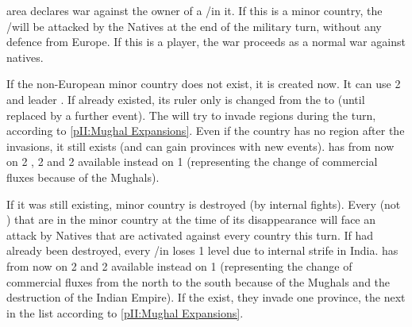 
\phevnt
\aparag \ROTW area \granderegionCeylan declares war against the owner of a
\TP/\COL in it.
\aparag If this is a minor country, the \TP/\COL will be attacked by the
Natives at the end of the military turn, without any defence from Europe.
\aparag If this is a player, the war proceeds as a normal war against natives.





\phevnt
\aparag If the non-European minor country \paysMogol does not exist, it is
created now.  It can use 2 \ARMY\faceplus and leader .
\aparag If \paysMogol already existed, its ruler only is changed from the
 to \leaderAkbar (until replaced by a further event).
\aparag The \paysMogol will try to invade  regions during the turn,
according to \ref{pII:Mughal Expansions}.
\aparag Even if the country has no region after the invasions, it still exists
(and can gain provinces with new events).
\aparag \granderegionBengale has from now on 2 , 2  and 2  available instead on 1 (representing the
change of commercial fluxes because of the Mughals).





\phevnt
\aparag If it was still existing, minor country \paysVijayanagar is destroyed
(by internal fights).  Every \TP (not \COL) that are in the minor country
\paysVijayanagar at the time of its disappearance will face an attack by
Natives that are activated against every country this turn.
\aparag If \paysVijayanagar had already been destroyed, every \TP/\COL in
 loses 1 level due to internal strife in India.
\aparag \granderegionKarnatika has from now on 2  and 2
 available instead on 1 (representing the change of
commercial fluxes from the north to the south because of the Mughals and the
destruction of the Indian Empire).
\aparag If the \paysMogol exist, they invade one province, the next in the
list according to \ref{pII:Mughal Expansions}.





